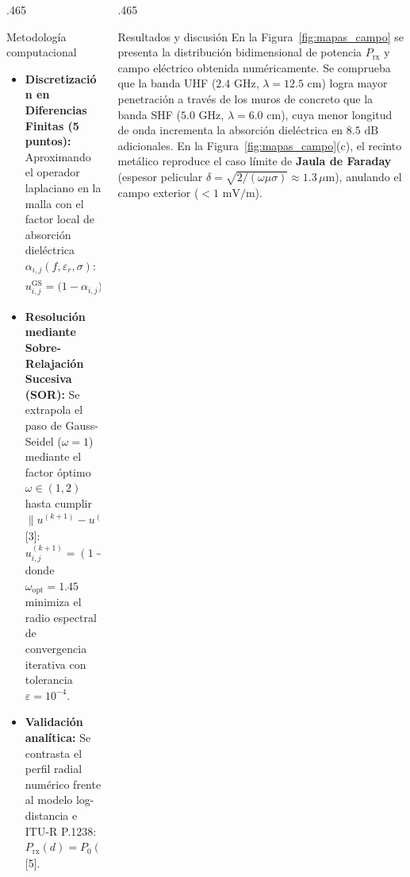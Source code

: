 \documentclass[final]{beamer}
\begin{document}
\begin{frame}[t]
\begin{columns}[t]
\begin{column}{.465\paperwidth}
				\begin{block}{Metodología computacional}
					\begin{itemize}
						\item \textbf{Discretización en Diferencias Finitas (5 puntos):} Aproximando el operador laplaciano en la malla con el factor local de absorción dieléctrica \(\alpha_{i,j}(f, \varepsilon_r, \sigma)\):
						\begin{equation}
							u_{i,j}^{\text{GS}} = \big(1 - \alpha_{i,j}\big)\,\frac{u_{i+1,j} + u_{i-1,j} + u_{i,j+1} + u_{i,j-1}}{4}
						\end{equation}
						\item \textbf{Resolución mediante Sobre-Relajación Sucesiva (SOR):} Se extrapola el paso de Gauss-Seidel (\(\omega = 1\)) mediante el factor óptimo \(\omega \in (1, 2)\) hasta cumplir \(\|u^{(k+1)} - u^{(k)}\|_\infty < \varepsilon\) [3]:
						\begin{equation}
							u_{i,j}^{(k+1)} = (1 - \omega)\,u_{i,j}^{(k)} + \omega\,u_{i,j}^{\text{GS}}
						\end{equation}
						donde \(\omega_{\text{opt}} = 1.45\) minimiza el radio espectral de convergencia iterativa con tolerancia \(\varepsilon = 10^{-4}\).
						\item \textbf{Validación analítica:} Se contrasta el perfil radial numérico frente al modelo log-distancia e ITU-R P.1238: \(P_{\text{rx}}(d) = P_0(d_0) - 10n\log_{10}(d/d_0) - \sum L_{\text{muro}}\) [5].
					\end{itemize}
				\end{block}
				
			\end{column}
			
			\hfill
			
			\begin{column}{.465\paperwidth}
				
				\begin{block}{Resultados y discusión}
					En la Figura~\ref{fig:mapas_campo} se presenta la distribución bidimensional de potencia \(P_{\text{rx}}\) y campo eléctrico obtenida numéricamente. Se comprueba que la banda UHF (\(2.4\text{ GHz}\), \(\lambda = 12.5\text{ cm}\)) logra mayor penetración a través de los muros de concreto que la banda SHF (\(5.0\text{ GHz}\), \(\lambda = 6.0\text{ cm}\)), cuya menor longitud de onda incrementa la absorción dieléctrica en \(8.5\text{ dB}\) adicionales. En la Figura~\ref{fig:mapas_campo}(c), el recinto metálico reproduce el caso límite de \textbf{Jaula de Faraday} (espesor pelicular \(\delta = \sqrt{2/(\omega\mu\sigma)} \approx 1.3\,\mu\text{m}\)), anulando el campo exterior (\(< 1\text{ mV/m}\)).
					

\end{block}
\end{column}
\end{columns}
\end{frame}
\end{document}
